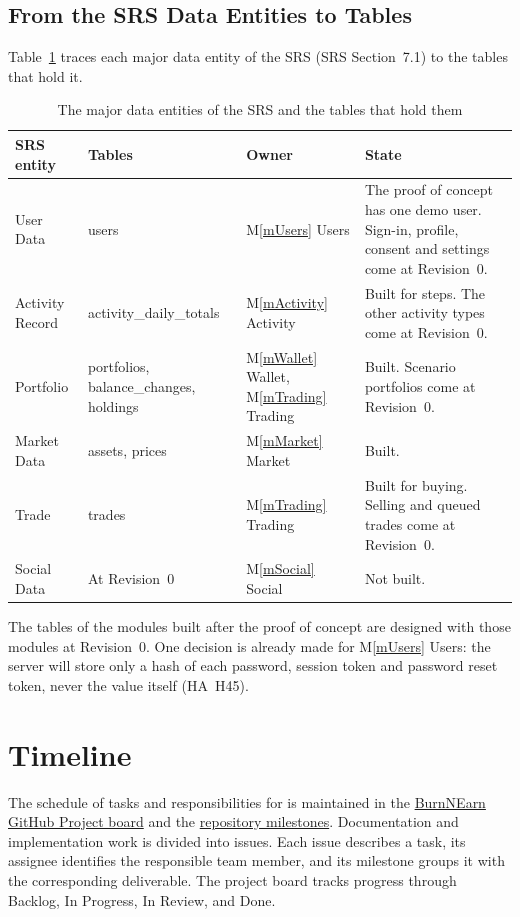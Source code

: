 \documentclass[12pt, titlepage]{article}
\newcommand{\mref}[1]{M\ref{#1}}
\begin{document}
\subsection{From the SRS Data Entities to Tables}

Table~\ref{TblDBEntities} traces each major data entity of the SRS (SRS
Section~7.1) to the tables that hold it.

\begin{table}[H]
\centering
\begin{tabularx}{\textwidth}{>{\raggedright\arraybackslash}p{} >{\raggedright\arraybackslash}p{} >{\raggedright\arraybackslash}p{} >{\raggedright\arraybackslash}X}
\toprule
\textbf{SRS entity} & \textbf{Tables} & \textbf{Owner} & \textbf{State}\\
\midrule
User Data & users & \mref{mUsers} Users & The proof of concept has one demo
  user. Sign-in, profile, consent and settings come at Revision~0.\\
Activity Record & activity\_daily\_totals & \mref{mActivity} Activity & Built
  for steps. The other activity types come at Revision~0.\\
Portfolio & portfolios, balance\_changes, holdings & \mref{mWallet} Wallet,
  \mref{mTrading} Trading & Built. Scenario portfolios come at Revision~0.\\
Market Data & assets, prices & \mref{mMarket} Market & Built.\\
Trade & trades & \mref{mTrading} Trading & Built for buying. Selling and queued
  trades come at Revision~0.\\
Social Data & At Revision~0 & \mref{mSocial} Social & Not built.\\
\bottomrule
\end{tabularx}
\caption{The major data entities of the SRS and the tables that hold them}
\label{TblDBEntities}
\end{table}

The tables of the modules built after the proof of concept are designed with
those modules at Revision~0. One decision is already made for
\mref{mUsers} Users: the server will store only a hash of each password,
session token and password reset token, never the value itself (HA~H45).

\section{Timeline}

The schedule of tasks and responsibilities for \progname{} is maintained in the \href{https://github.com/users/davislenover/projects/4/views/1} {BurnNEarn GitHub Project board} and the \href{https://github.com/davislenover/BurnNEarn/milestones} {repository milestones}. Documentation and implementation work is divided into issues. Each issue describes a task, its assignee identifies the responsible team member, and its milestone groups it with the corresponding deliverable. The project board tracks progress through Backlog, In Progress, In Review, and Done.
\end{document}
